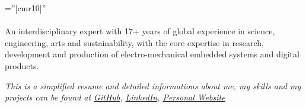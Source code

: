 \font\fb=''[cmr10]''

\par{
\paragraph{}
An interdisciplinary expert with 17+ years of global experience in science, engineering, arts and sustainability, with the core expertise in research, development and production of electro-mechanical embedded systems and digital products.

\emph{This is a simplified resume and detailed informations about me, my skills and my projects can be found at \href{https://github.com/AravinthPanch}{GitHub}, \href{https://www.linkedin.com/in/aravinthpanch/}{LinkedIn}, \href{https://aravinth.info}{Personal Website}}
\par}
